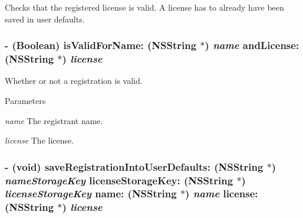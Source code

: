 Checks that the registered license is valid. A license has to already have been saved in user defaults. \hypertarget{interface_g_d_registration_aff2e80860b72d462954323dd0203834f}{
\subsubsection[{isValidForName:andLicense:}]{\setlength{\rightskip}{0pt plus 5cm}-\/ (Boolean) isValidForName: (NSString $\ast$) {\em name}\/ andLicense: (NSString $\ast$) {\em license}}}
\label{interface_g_d_registration_aff2e80860b72d462954323dd0203834f}


Whether or not a registration is valid. 
\begin{DoxyParams}{Parameters}
\item[{\em name}]The registrant name. \item[{\em license}]The license. \end{DoxyParams}
\hypertarget{interface_g_d_registration_acc5044a15435a573919d7f6c68a70ff0}{
\subsubsection[{saveRegistrationIntoUserDefaults:licenseStorageKey:name:license:}]{\setlength{\rightskip}{0pt plus 5cm}-\/ (void) saveRegistrationIntoUserDefaults: (NSString $\ast$) {\em nameStorageKey}\/ licenseStorageKey: (NSString $\ast$) {\em licenseStorageKey}\/ name: (NSString $\ast$) {\em name}\/ license: (NSString $\ast$) {\em license}}}
\label{interface_g_d_registration_acc5044a15435a573919d7f6c68a70ff0}



